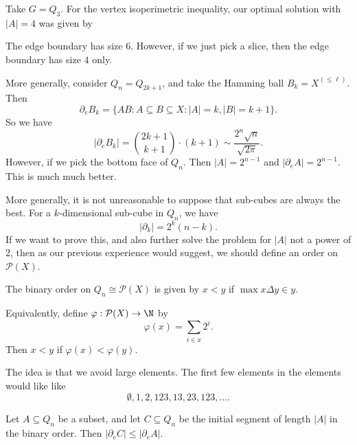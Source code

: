 \documentclass[a4paper]{article}
\begin{document}
\begin{eg}
  Take $G = Q_3$. For the vertex isoperimetric inequality, our optimal solution with $|A| = 4$ was given by
  \begin{center}
  \end{center}
  The edge boundary has size $6$. However, if we just pick a slice, then the edge boundary has size $4$ only.
\end{eg}
More generally, consider $Q_n = Q_{2k + 1}$, and take the Hamming ball $B_k = X^{(\leq \ell)}$. Then
\[
  \partial_e B_k = \{AB: A \subseteq B \subseteq X: |A| = k, |B| = k + 1\}.
\]
So we have
\[
  |\partial_e B_k| = \binom{2k + 1}{k + 1} \cdot (k + 1) \sim \frac{2^n \sqrt{n}}{\sqrt{2\pi}}.
\]
However, if we pick the bottom face of $Q_n$. Then $|A| = 2^{n - 1}$ and $|\partial_e A| = 2^{n - 1}$. This is much much better.

More generally, it is not unreasonable to suppose that sub-cubes are always the best. For a $k$-dimensional sub-cube in $Q_n$, we have
\[
  |\partial_k| = 2^k (n - k).
\]
If we want to prove this, and also further solve the problem for $|A|$ not a power of $2$, then as our previous experience would suggest, we should define an order on $\mathcal{P}(X)$.

\begin{defi}
  The binary order on $Q_n \cong \mathcal{P}(X)$ is given by $x < y$ if $\max x \Delta y \in y$.

  Equivalently, define $\varphi: \mathcal{P}(X) \to \N$ by
  \[
    \varphi(x) = \sum_{i \in x} 2^i.
  \]
  Then $x < y$ if $\varphi(x) < \varphi(y)$.
\end{defi}
The idea is that we avoid large elements. The first few elements in the elements would like like
\[
  \emptyset, 1, 2, 12 3, 13, 23, 123, \ldots.
\]
\begin{thm}
  Let $A \subseteq Q_n$ be a subset, and let $C \subseteq Q_n$ be the initial segment of length $|A|$ in the binary order. Then $|\partial_e C| \leq |\partial_e A|$.
\end{thm}
\end{document}
